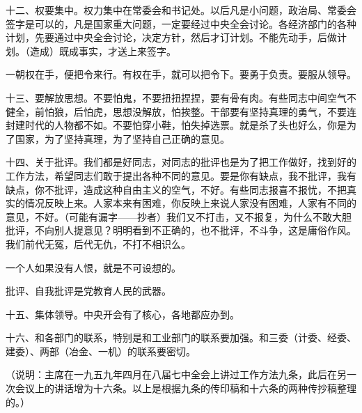 十二、权要集中。权力集中在常委会和书记处。以后凡是小问题，政治局、常委会签字是可以的，凡是国家重大问题，一定要经过中央全会讨论。各经济部门的各种计划，先要通过中央全会讨论，决定方针，然后才订计划。不能先动手，后做计划。（造成）既成事实，才送上来签字。

一朝权在手，便把令来行。有权在手，就可以把令下。要勇于负责。要服从领导。

十三、要解放思想。不要怕鬼，不要扭扭捏捏，要有骨有肉。有些同志中间空气不健全，前怕狼，后怕虎，思想没解放，怕挨整。干部要有坚持真理的勇气，不要连封建时代的人物都不如。不要怕穿小鞋，怕失掉选票。就是杀了头也好么，你是为了国家，为了坚持真理，为了坚持自己正确的意见。

十四、关于批评。我们都是好同志，对同志的批评也是为了把工作做好，找到好的工作方法，希望同志们敢于提出各种不同的意见。要是你有缺点，我不批评，我有缺点，你不批评，造成这种自由主义的空气，不好。有些同志报喜不报忧，不把真实的情况反映上来。人家本来有困难，你反映上来说人家没有困难，人家有不同的意见，不好。（可能有漏字——抄者）我们又不打击，又不报复，为什么不敢大胆批评，不向别人提意见？明明看到不正确的，也不批评，不斗争，这是庸俗作风。我们前代无冤，后代无仇，不打不相识么。

一个人如果没有人恨，就是不可设想的。

批评、自我批评是党教育人民的武器。

十五、集体领导。中央开会有了核心，各地都应办到。

十六、和各部门的联系，特别是和工业部门的联系要加强。和三委（计委、经委、建委）、两部（冶金、一机）的联系要密切。

（说明：主席在一九五九年四月在八届七中全会上讲过工作方法九条，此后在另一次会议上的讲话增为十六条。以上是根据九条的传印稿和十六条的两种传抄稿整理的。）



